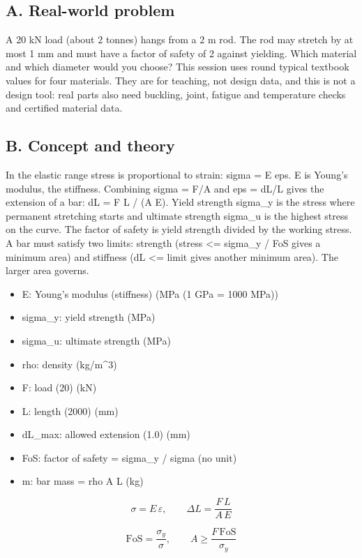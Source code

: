 \documentclass[11pt,a4paper]{article}
\begin{document}
\subsection*{A. Real-world problem}
A 20 kN load (about 2 tonnes) hangs from a 2 m rod. The rod may stretch by at most 1 mm and must have a factor of safety of 2 against yielding. Which material and which diameter would you choose? This session uses round typical textbook values for four materials. They are for teaching, not design data, and this is not a design tool: real parts also need buckling, joint, fatigue and temperature checks and certified material data.

\subsection*{B. Concept and theory}
In the elastic range stress is proportional to strain: sigma = E eps. E is Young's modulus, the stiffness. Combining sigma = F/A and eps = dL/L gives the extension of a bar: dL = F L / (A E). Yield strength sigma\_y is the stress where permanent stretching starts and ultimate strength sigma\_u is the highest stress on the curve. The factor of safety is yield strength divided by the working stress. A bar must satisfy two limits: strength (stress \textless{}= sigma\_y / FoS gives a minimum area) and stiffness (dL \textless{}= limit gives another minimum area). The larger area governs.

\begin{itemize}[nosep]
\item E: Young's modulus (stiffness) (MPa (1 GPa = 1000 MPa))
\item sigma\_y: yield strength (MPa)
\item sigma\_u: ultimate strength (MPa)
\item rho: density (kg/m\textasciicircum{}3)
\item F: load (20) (kN)
\item L: length (2000) (mm)
\item dL\_max: allowed extension (1.0) (mm)
\item FoS: factor of safety = sigma\_y / sigma (no unit)
\item m: bar mass = rho A L (kg)
\end{itemize}

\begin{equation*}
\sigma=E\,\varepsilon,\qquad \Delta L=\frac{F\,L}{A\,E}
\end{equation*}

\begin{equation*}
\mathrm{FoS}=\frac{\sigma_y}{\sigma},\qquad A\ge\frac{F\,\mathrm{FoS}}{\sigma_y}
\end{equation*}
\end{document}
